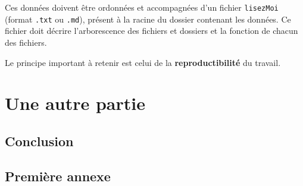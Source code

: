 \documentclass[a4paper,12pt,twoside]{book}
\begin{document}
	Ces données doivent être ordonnées et accompagnées d'un fichier \texttt{lisezMoi} (format \texttt{.txt} ou \texttt{.md}), présent à la racine du dossier contenant les données. Ce fichier doit décrire l'arborescence des fichiers et dossiers et la fonction de chacun des fichiers.
	
	Le principe important à retenir est celui de la \textbf{reproductibilité} du travail.
	
	\part{Une autre partie}
	
	
	
	\chapter*{Conclusion}
	
	\appendix
	\chapter{Première annexe}
	
	\backmatter
	
	
	
	
	
	\tableofcontents
	
\end{document}
